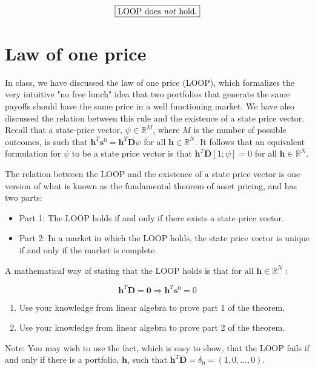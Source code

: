 \documentclass{article}
\begin{document}
\[
\boxed{\text{LOOP does \emph{not} hold.}}
\]

\newpage
\section{Law of one price}
In class, we have discussed the law of one price (LOOP), which formalizes the very intuitive "no free lunch" idea that two portfolios that generate the same payoffs should have the same price in a well functioning market. We have also discussed the relation between this rule and the existence of a state price vector. Recall that a state-price vector, $\psi \in \mathbb{R}^{M}$, where $M$ is the number of possible outcomes, is such that $\mathbf{h}^{T} \mathbf{s}^{0}=\mathbf{h}^{T} \mathbf{D} \psi$ for all $\mathbf{h} \in \mathbb{R}^{N}$. It follows that an equivalent formulation for $\psi$ to be a state price vector is that $\mathbf{h}^{T} \overline{\mathbf{D}}[1 ; \psi]=0$ for all $\mathbf{h} \in \mathbb{R}^{N}$.

The relation between the LOOP and the existence of a state price vector is one version of what is known as the fundamental theorem of asset pricing, and has two parts:

\begin{itemize}
\item Part 1: The LOOP holds if and only if there exists a state price vector.
\item Part 2: In a market in which the LOOP holds, the state price vector is unique if and only if the market is complete.
\end{itemize}

A mathematical way of stating that the LOOP holds is that for all $\mathbf{h} \in \mathbb{R}^{N}$ :

\[
\mathbf{h}^{T} \mathbf{D}=\mathbf{0} \Rightarrow \mathbf{h}^{T} \mathbf{s}^{0}=0
\]

\begin{enumerate}
\item[(a)] Use your knowledge from linear algebra to prove part 1 of the theorem.
\item[(b)] Use your knowledge from linear algebra to prove part 2 of the theorem.
\end{enumerate}

Note: You may wish to use the fact, which is easy to show, that the LOOP fails if and only if there is a portfolio, $\mathbf{h}$, such that $\mathbf{h}^{T} \overline{\mathbf{D}}=\delta_{0}=(1,0, \ldots, 0)$.
\end{document}
